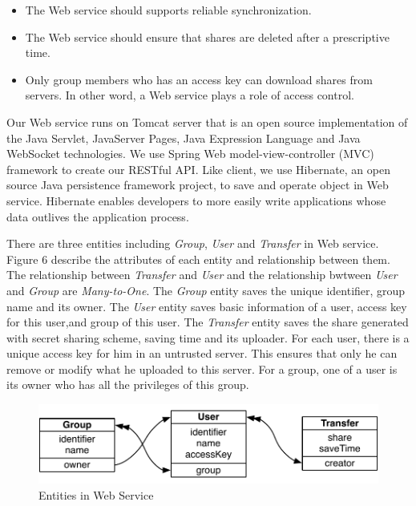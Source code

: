 \documentclass[twocolumn,10pt]{article}
\begin{document}
\begin{itemize}
\setlength{\itemsep}{1pt}
\setlength{\parskip}{0pt}
\setlength{\parsep}{0pt}
	\item The Web service should supports reliable synchronization.
    \item The Web service should ensure that shares are deleted after a prescriptive time.
    \item Only group members who has an access key can download shares from servers. In other word, a Web service plays a role of access control.
\end{itemize}

Our Web service runs on Tomcat server that is an open source implementation of the Java Servlet, JavaServer Pages, Java Expression Language and Java WebSocket technologies. We use Spring Web model-view-controller (MVC) framework to create our RESTful API. Like client, we use Hibernate, an open source Java persistence framework project, to save and operate object in Web service. Hibernate enables developers to more easily write applications whose data outlives the application process.

There are three entities including \emph{Group}, \emph{User} and \emph{Transfer} in Web service. Figure 6 describe the attributes of each entity and relationship between them. The relationship between \emph{Transfer} and \emph{User} and the relationship bwtween \emph{User} and \emph{Group} are \emph{Many-to-One}. The \emph{Group} entity saves the unique identifier, group name and its owner. The \emph{User} entity saves basic information of a user, access key for this user,and group of this user. The \emph{Transfer} entity saves the share generated with secret sharing scheme, saving time and its uploader. For each user, there is a unique access key for him in an untrusted server. This ensures that only he can remove or modify what he uploaded to this server. For a group, one of a user is its owner who has all the privileges of this group.

\begin{figure}[t]
	\centering
	\includegraphics[scale=0.5]{entites}
	\caption{Entities in Web Service}
\end{figure}
\end{document}
